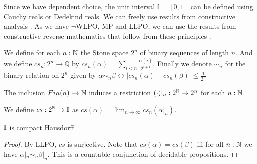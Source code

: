 Since we have dependent choice, the unit interval $\mathbb I = [0,1]$ can be defined using 
Cauchy reals or Dedekind reals. 
We can freely use results from constructive analysis \cite{Bishop}. 
As we have $\neg$WLPO, MP and LLPO, we can use the results from 
constructive reverse mathematics that follow from these principles \cite{ReverseMathsBishop, HannesDiener}. 
\begin{definition}
  We define for each $n:\mathbb{N}$ the Stone space $2^n$ of binary sequences of length $n$.
  And we define $cs_n:2^n \to \mathbb Q$ by 
  $cs_n(\alpha) = \sum_{i < n } \frac{\alpha(i)}{2^{i+1}}.$
  Finally we denote $\sim_n$ for the binary relation on $2^n$ given by 
  $\alpha\sim_n \beta 
  \leftrightarrow \left|cs_n(\alpha) - cs_n(\beta)\right|\leq\frac{1}{2^n}$
\end{definition}
\begin{remark}
  The inclusion $Fin(n) \hookrightarrow \mathbb{N}$ induces a restriction 
  $(\cdot)|_n : 2^{\mathbb{N}} \to 2^n$ for each $n:\mathbb{N}$. 
\end{remark}
\begin{definition}
  We define $cs:2^{\mathbb{N}} \to \mathbb{I}$ as 
  $cs(\alpha) = \lim_{n\to\infty} cs_n(\alpha|_n)$. 
\end{definition}

\begin{theorem}\label{IntervalIsCHaus}
  $\mathbb{I}$ is compact Hausdorff
\end{theorem}
\begin{proof}
  By LLPO, $cs$ is surjective.   
  Note that $cs(\alpha) = cs(\beta)$ iff 
  for all $n:\mathbb{N}$ we have $\alpha|_n \sim_n \beta|_n$. 
  This is a countable conjunction of decidable propositions.
\end{proof}

